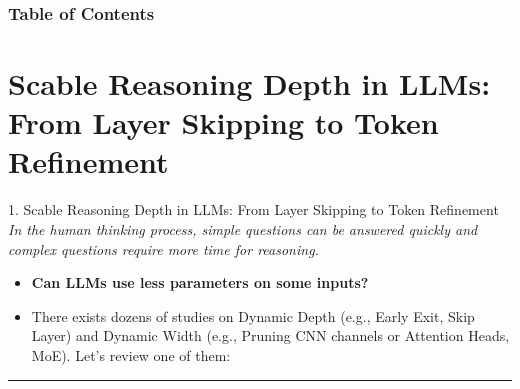 \documentclass[12pt, aspectratio=169]{beamer}
\begin{document}
\begin{frame}
\frametitle{Table of Contents}
    \Large \tableofcontents
\end{frame}


\section{Scable Reasoning Depth in LLMs:\\ From Layer Skipping to Token Refinement}

\begin{frame}{1. Scable Reasoning Depth in LLMs: \hspace{5cm} From Layer Skipping to Token Refinement}
    \textit{In the human thinking process, simple questions can be answered quickly and complex questions require more time for reasoning.}
    \begin{itemize}
        \item \textbf{Can LLMs use less parameters on some inputs?}
        \item There exists dozens of studies on Dynamic Depth (e.g., Early Exit, Skip Layer) and Dynamic Width (e.g., Pruning CNN channels or Attention Heads, MoE). Let's review one of them:
    \end{itemize}
    \noindent\rule{\linewidth}{0.2mm}


\end{frame}
\end{document}
